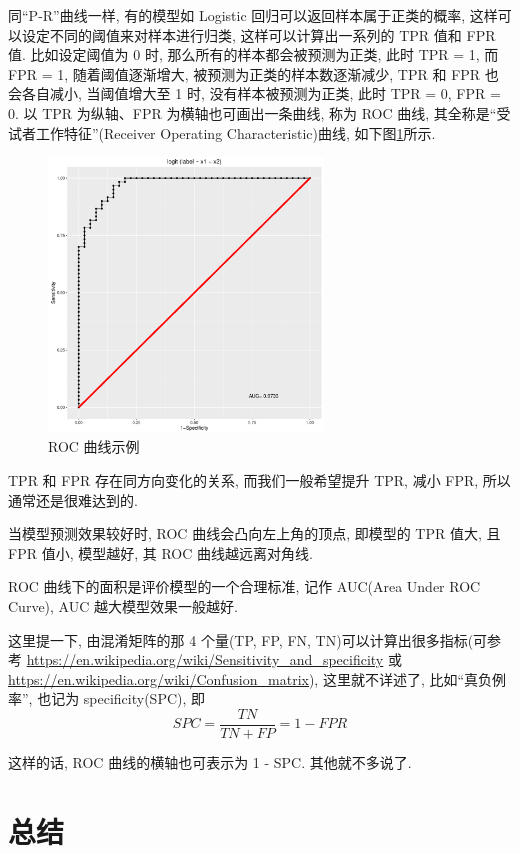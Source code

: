 \documentclass[a4paper,UTF8]{ctexart}
\theoremstyle{plain} \newtheorem{theorem}{定理}[section]
\theoremstyle{plain} \newtheorem{definition}{定义}[section]
\theoremstyle{plain} \newtheorem{lemma}{引理}[section]
\theoremstyle{plain} \newtheorem{proposition}{命题}[section]
\theoremstyle{plain} \newtheorem{example}{例}[section]
\theoremstyle{plain} \newtheorem{remark}{注}[section]
\theoremstyle{plain} \newtheorem{corollary}{推论}[section]
\begin{document}
同“P-R”曲线一样, 有的模型如 Logistic 回归可以返回样本属于正类的概率, 这样可以设定不同的阈值来对样本进行归类, 这样可以计算出一系列的 TPR 值和 FPR 值. 比如设定阈值为 0 时, 那么所有的样本都会被预测为正类, 此时 TPR = 1, 而 FPR = 1, 随着阈值逐渐增大, 被预测为正类的样本数逐渐减少,  TPR 和 FPR 也会各自减小, 当阈值增大至 1 时, 没有样本被预测为正类, 此时 TPR = 0, FPR = 0. 以 TPR 为纵轴、FPR 为横轴也可画出一条曲线, 称为 ROC 曲线, 其全称是“受试者工作特征”(Receiver Operating Characteristic)曲线, 如下图\ref{roc}所示.
\begin{figure}[!htb]
	\centering
	\includegraphics[width=0.65\textwidth]{ROC.pdf}
	\caption{ROC 曲线示例}
	\label{roc}
\end{figure}

TPR 和 FPR 存在同方向变化的关系, 而我们一般希望提升 TPR, 减小 FPR, 所以通常还是很难达到的.

当模型预测效果较好时, ROC 曲线会凸向左上角的顶点, 即模型的 TPR 值大, 且 FPR 值小, 模型越好, 其 ROC 曲线越远离对角线.

ROC 曲线下的面积是评价模型的一个合理标准, 记作 AUC(Area Under ROC Curve), AUC 越大模型效果一般越好.

这里提一下, 由混淆矩阵的那 4 个量(TP, FP, FN, TN)可以计算出很多指标(可参考 \url{https://en.wikipedia.org/wiki/Sensitivity_and_specificity} 或 \url{https://en.wikipedia.org/wiki/Confusion_matrix}), 这里就不详述了, 比如“真负例率”, 也记为 specificity(SPC), 即
\begin{equation}
SPC = \frac{TN}{TN + FP} = 1 - FPR
\end{equation}

这样的话, ROC 曲线的横轴也可表示为 1 - SPC. 其他就不多说了.


\section{总结}
\end{document}
